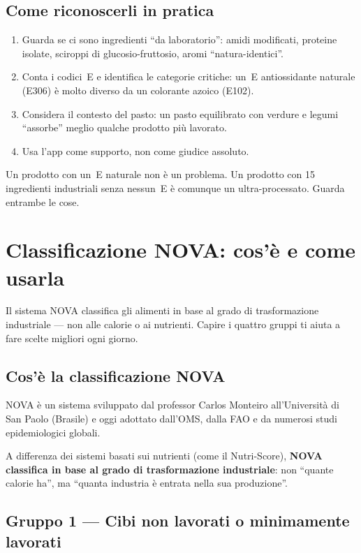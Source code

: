 \documentclass[a5paper,12pt,oneside,openany]{book}
\newcommand{\boxinfo}[2]{%
  \begin{tcolorbox}[boxbase,
    colback=blinfo!8!white, colframe=blinfo, title={#1}]
  #2\end{tcolorbox}}
\begin{document}
\section{Come riconoscerli in pratica}

\begin{enumerate}
  \item Guarda se ci sono ingredienti ``da laboratorio'': amidi modificati,
    proteine isolate, sciroppi di glucosio-fruttosio, aromi
    ``natura-identici''.
  \item Conta i codici~E e identifica le categorie critiche: un~E
    antiossidante naturale (E306) è molto diverso da un colorante azoico
    (E102).
  \item Considera il contesto del pasto: un pasto equilibrato con verdure
    e legumi ``assorbe'' meglio qualche prodotto più lavorato.
  \item Usa l'app come supporto, non come giudice assoluto.
\end{enumerate}

\boxinfo{Riassunto in una frase}{Un prodotto con un~E naturale non è un
problema. Un prodotto con 15 ingredienti industriali senza nessun~E è
comunque un ultra-processato. Guarda entrambe le cose.}

\chapter{Classificazione NOVA: cos'è e come usarla}

Il sistema NOVA classifica gli alimenti in base al grado di trasformazione
industriale --- non alle calorie o ai nutrienti. Capire i quattro gruppi
ti aiuta a fare scelte migliori ogni giorno.

\section{Cos'è la classificazione NOVA}

NOVA è un sistema sviluppato dal professor Carlos Monteiro all'Università
di San Paolo (Brasile) e oggi adottato dall'OMS, dalla FAO e da numerosi
studi epidemiologici globali.

A differenza dei sistemi basati sui nutrienti (come il Nutri-Score),
\textbf{NOVA classifica in base al grado di trasformazione industriale}:
non ``quante calorie ha'', ma ``quanta industria è entrata nella sua
produzione''.

\section{Gruppo 1 --- Cibi non lavorati o minimamente lavorati}
\end{document}

